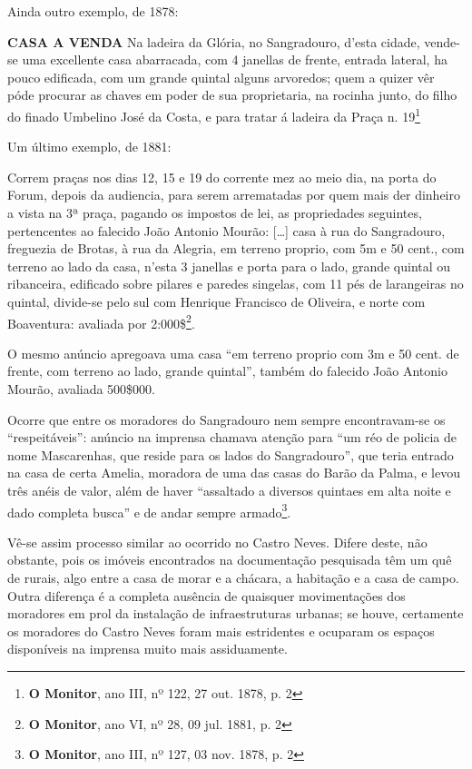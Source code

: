Ainda outro exemplo, de 1878:

\begin{citacao}
\textbf{CASA A VENDA}
Na ladeira da Glória, no Sangradouro, d'esta cidade, vende-se uma excellente casa abarracada, com 4 janellas de frente, entrada lateral, ha pouco edificada, com um grande quintal alguns arvoredos; quem a quizer vêr póde procurar as chaves em poder de sua proprietaria, na rocinha junto, do filho do finado Umbelino José da Costa, e para tratar á ladeira da Praça n. 19\footnote{\textbf{O Monitor}, ano III, nº 122, 27 out. 1878, p. 2}
\end{citacao}

Um último exemplo, de 1881:

\begin{citacao}
Correm praças nos dias 12, 15 e 19 do corrente mez ao meio dia, na porta do Forum, depois da audiencia, para serem arrematadas por quem mais der dinheiro a vista na 3ª praça, pagando os impostos de lei, as propriedades seguintes, pertencentes ao falecido João Antonio Mourão: [\dots] casa à rua do Sangradouro, freguezia de Brotas, à rua da Alegria, em terreno proprio, com 5m e 50 cent., com terreno ao lado da casa, n'esta 3 janellas e porta para o lado, grande quintal ou ribanceira, edificado sobre pilares e paredes singelas, com 11 pés de larangeiras no quintal, divide-se pelo sul com Henrique Francisco de Oliveira, e norte com Boaventura: avaliada por 2:000\$\footnote{\textbf{O Monitor}, ano VI, nº 28, 09 jul. 1881, p. 2}.
\end{citacao}

O mesmo anúncio apregoava uma casa ``em terreno proprio com 3m e 50 cent. de frente, com terreno ao lado, grande quintal'', também do falecido João Antonio Mourão, avaliada 500\$000.

Ocorre que entre os moradores do Sangradouro nem sempre encontravam-se os ``respeitáveis'': anúncio na imprensa chamava atenção para ``um réo de policia de nome Mascarenhas, que reside para os lados do Sangradouro'', que teria entrado na casa de certa Amelia, moradora de uma das casas do Barão da Palma, e levou três anéis de valor, além de haver ``assaltado a diversos quintaes em alta noite e dado completa busca'' e de andar sempre armado\footnote{\textbf{O Monitor}, ano III, nº 127, 03 nov. 1878, p. 2}.

Vê-se assim processo similar ao ocorrido no Castro Neves. Difere deste, não obstante, pois os imóveis encontrados na documentação pesquisada têm um quê de rurais, algo entre a casa de morar e a chácara, a habitação e a casa de campo. Outra diferença é a completa ausência de quaisquer movimentações dos moradores em prol da instalação de infraestruturas urbanas; se houve, certamente os moradores do Castro Neves foram mais estridentes e ocuparam os espaços disponíveis na imprensa muito mais assiduamente. 

